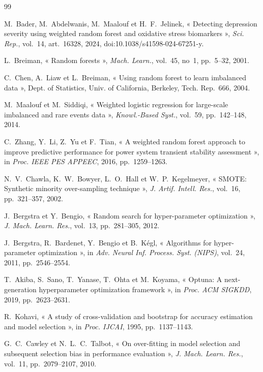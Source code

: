 \begin{thebibliography}{99}\footnotesize
\setlength{\itemsep}{0pt}\setlength{\parskip}{0pt}

 M.~Bader, M.~Abdelwanis, M.~Maalouf et H.~F.~Jelinek, « Detecting depression severity using weighted random forest and oxidative stress biomarkers », \emph{Sci. Rep.}, vol.~14, art.~16328, 2024, doi:10.1038/s41598-024-67251-y.

 L.~Breiman, « Random forests », \emph{Mach. Learn.}, vol.~45, no~1, pp.~5--32, 2001.

 C.~Chen, A.~Liaw et L.~Breiman, « Using random forest to learn imbalanced data », Dept. of Statistics, Univ. of California, Berkeley, Tech. Rep.~666, 2004.

 M.~Maalouf et M.~Siddiqi, « Weighted logistic regression for large-scale imbalanced and rare events data », \emph{Knowl.-Based Syst.}, vol.~59, pp.~142--148, 2014.

 C.~Zhang, Y.~Li, Z.~Yu et F.~Tian, « A weighted random forest approach to improve predictive performance for power system transient stability assessment », in \emph{Proc. IEEE PES APPEEC}, 2016, pp.~1259--1263.

 N.~V.~Chawla, K.~W.~Bowyer, L.~O.~Hall et W.~P.~Kegelmeyer, « SMOTE: Synthetic minority over-sampling technique », \emph{J. Artif. Intell. Res.}, vol.~16, pp.~321--357, 2002.

 J.~Bergstra et Y.~Bengio, « Random search for hyper-parameter optimization », \emph{J. Mach. Learn. Res.}, vol.~13, pp.~281--305, 2012.

 J.~Bergstra, R.~Bardenet, Y.~Bengio et B.~K\'egl, « Algorithms for hyper-parameter optimization », in \emph{Adv. Neural Inf. Process. Syst. (NIPS)}, vol.~24, 2011, pp.~2546--2554.

 T.~Akiba, S.~Sano, T.~Yanase, T.~Ohta et M.~Koyama, « Optuna: A next-generation hyperparameter optimization framework », in \emph{Proc. ACM SIGKDD}, 2019, pp.~2623--2631.

 R.~Kohavi, « A study of cross-validation and bootstrap for accuracy estimation and model selection », in \emph{Proc. IJCAI}, 1995, pp.~1137--1143.

 G.~C.~Cawley et N.~L.~C.~Talbot, « On over-fitting in model selection and subsequent selection bias in performance evaluation », \emph{J. Mach. Learn. Res.}, vol.~11, pp.~2079--2107, 2010.


\end{thebibliography}
